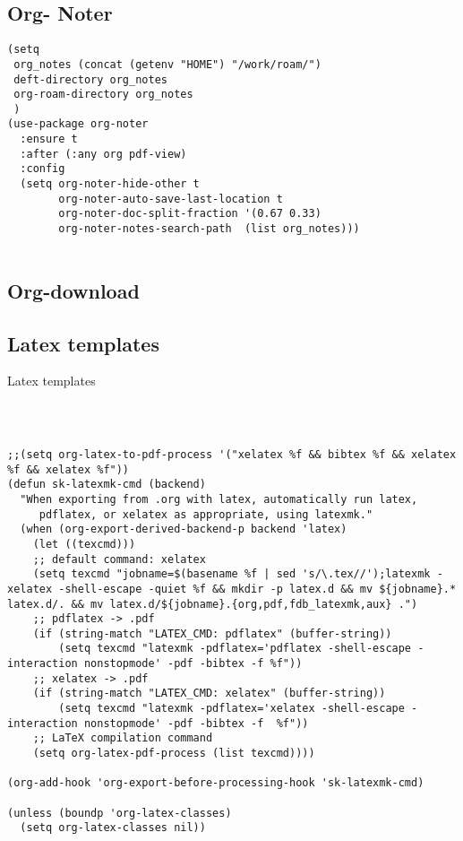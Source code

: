 \documentclass[12pt]{article}
\begin{document}
\subsection{Org- Noter}
\label{sec:orge34521a}

\begin{verbatim}
(setq
 org_notes (concat (getenv "HOME") "/work/roam/")
 deft-directory org_notes
 org-roam-directory org_notes
 )
(use-package org-noter
  :ensure t
  :after (:any org pdf-view)
  :config
  (setq org-noter-hide-other t
        org-noter-auto-save-last-location t
        org-noter-doc-split-fraction '(0.67 0.33)
        org-noter-notes-search-path  (list org_notes)))


\end{verbatim}


\subsection{Org-download}
\label{sec:org6db49cc}

\subsection{Latex templates}
\label{sec:orge40dfb6}
Latex templates
\begin{verbatim}



;;(setq org-latex-to-pdf-process '("xelatex %f && bibtex %f && xelatex %f && xelatex %f"))
(defun sk-latexmk-cmd (backend)
  "When exporting from .org with latex, automatically run latex,
     pdflatex, or xelatex as appropriate, using latexmk."
  (when (org-export-derived-backend-p backend 'latex)
    (let ((texcmd)))
    ;; default command: xelatex
    (setq texcmd "jobname=$(basename %f | sed 's/\.tex//');latexmk -xelatex -shell-escape -quiet %f && mkdir -p latex.d && mv ${jobname}.* latex.d/. && mv latex.d/${jobname}.{org,pdf,fdb_latexmk,aux} .")
    ;; pdflatex -> .pdf
    (if (string-match "LATEX_CMD: pdflatex" (buffer-string))
        (setq texcmd "latexmk -pdflatex='pdflatex -shell-escape -interaction nonstopmode' -pdf -bibtex -f %f"))
    ;; xelatex -> .pdf
    (if (string-match "LATEX_CMD: xelatex" (buffer-string))
        (setq texcmd "latexmk -pdflatex='xelatex -shell-escape -interaction nonstopmode' -pdf -bibtex -f  %f"))
    ;; LaTeX compilation command
    (setq org-latex-pdf-process (list texcmd))))

(org-add-hook 'org-export-before-processing-hook 'sk-latexmk-cmd)

(unless (boundp 'org-latex-classes)
  (setq org-latex-classes nil))
\end{verbatim}
\end{document}
